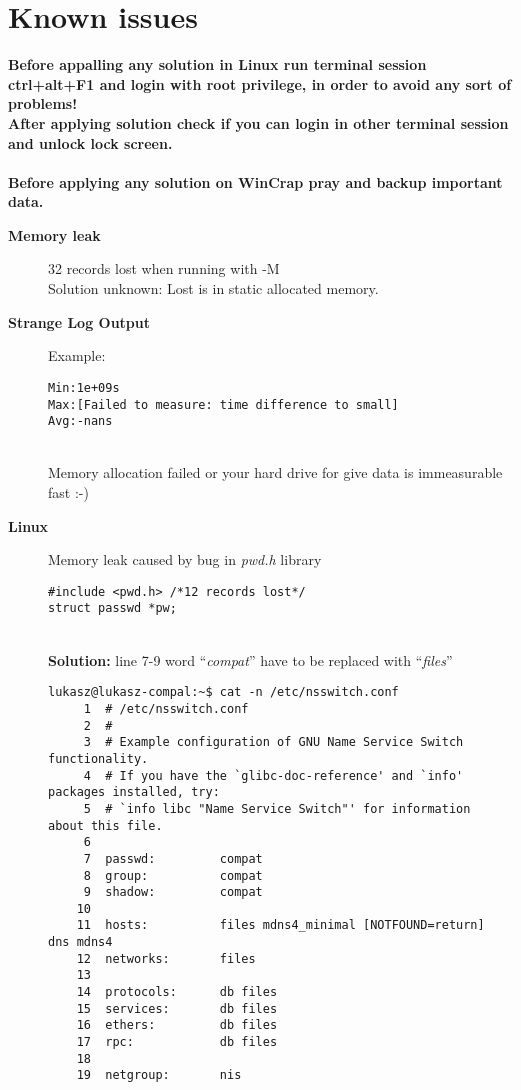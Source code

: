 \hypertarget{KnownIssues}{
\section{Known issues}
\label{KnownIssues}
}

{\bf Before appalling any solution in Linux run terminal session ctrl+alt+F1 and login with root privilege, in order to avoid any sort of problems!\\
After applying solution check if you can login in other terminal session and unlock lock screen.\\ \\
}
{\bf Before applying any solution on WinCrap pray and backup important data.
}

\begin{description}
\item [\bf{Memory leak}] 32 records lost when running with -M\\ Solution unknown: Lost is in static allocated memory.
\item [\bf{Strange Log Output}] Example: \begin{verbatim}
Min:1e+09s
Max:[Failed to measure: time difference to small]
Avg:-nans
\end{verbatim}\\
Memory allocation failed or your hard drive for give data is immeasurable fast :-)

\item [{\bf Linux}] Memory leak caused by bug in {\itshape pwd.h} library
\begin{verbatim}
#include <pwd.h> /*12 records lost*/
struct passwd *pw;
\end{verbatim}
\\{\bf Solution:} line 7-9 word ``{\itshape compat}'' have to be replaced with ``{\itshape files}''
\begin{verbatim}
lukasz@lukasz-compal:~$ cat -n /etc/nsswitch.conf 
     1	# /etc/nsswitch.conf
     2	#
     3	# Example configuration of GNU Name Service Switch functionality.
     4	# If you have the `glibc-doc-reference' and `info' packages installed, try:
     5	# `info libc "Name Service Switch"' for information about this file.
     6	
     7	passwd:         compat
     8	group:          compat
     9	shadow:         compat
    10	
    11	hosts:          files mdns4_minimal [NOTFOUND=return] dns mdns4
    12	networks:       files
    13	
    14	protocols:      db files
    15	services:       db files
    16	ethers:         db files
    17	rpc:            db files
    18	
    19	netgroup:       nis
\end{verbatim}

\end{description}
